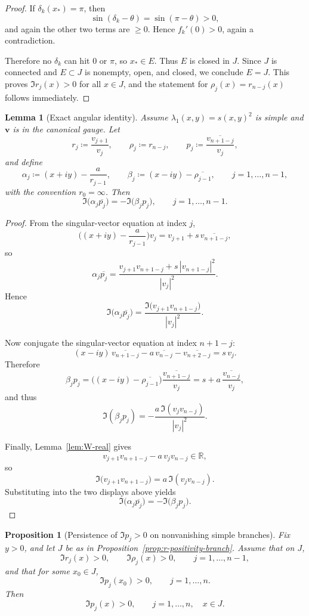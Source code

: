 \documentclass[11pt]{article}
\newtheorem{lemma}[theorem]{Lemma}
\newtheorem{proposition}[theorem]{Proposition}
\begin{document}
\begin{proof}
If \(\delta_k(x_*)=\pi\), then
\[
\sin(\delta_k-\theta)=\sin(\pi-\theta)>0,
\]
and again the other two terms are \(\ge 0\). Hence \(f_k'(0)>0\), again a contradiction.

Therefore no \(\delta_k\) can hit \(0\) or \(\pi\), so \(x_*\in E\). Thus \(E\) is closed in \(J\). Since \(J\) is connected and \(E\subset J\) is nonempty, open, and closed, we conclude \(E=J\). This proves \(\Im r_j(x)>0\) for all \(x\in J\), and the statement for \(\rho_j(x)=r_{n-j}(x)\) follows immediately.
\end{proof}

\begin{lemma}[Exact angular identity]\label{lem:angular-identity}
Assume \(\lambda_1(x,y)=s(x,y)^2\) is simple and \(\mathbf v\) is in the canonical gauge. Let
\[
r_j\coloneqq \frac{v_{j+1}}{v_j},
\qquad
\rho_j\coloneqq r_{n-j},
\qquad
p_j\coloneqq \frac{\overline{v_{n+1-j}}}{v_j},
\]
and define
\[
\alpha_j\coloneqq (x+iy)-\frac{a}{r_{j-1}},
\qquad
\beta_j\coloneqq (x-iy)-\overline{\rho_{j-1}},
\qquad
j=1,\dots,n-1,
\]
with the convention \(r_0=\infty\). Then
\[
\Im\!\bigl(\alpha_j\overline{p_j}\bigr)
=
-\Im\!\bigl(\beta_j p_j\bigr),
\qquad
j=1,\dots,n-1.
\]
\end{lemma}

\begin{proof}
From the singular-vector equation at index \(j\),
\[
\biggl((x+iy)-\frac{a}{r_{j-1}}\biggr)v_j
=
v_{j+1}+s\,\overline{v_{n+1-j}},
\]
so
\[
\alpha_j\overline{p_j}
=
\frac{v_{j+1}v_{n+1-j}+s\,|v_{n+1-j}|^2}{|v_j|^2}.
\]
Hence
\[
\Im\!\bigl(\alpha_j\overline{p_j}\bigr)
=
\frac{\Im\!\bigl(v_{j+1}v_{n+1-j}\bigr)}{|v_j|^2}.
\]

Now conjugate the singular-vector equation at index \(n+1-j\):
\[
(x-iy)\,\overline{v_{n+1-j}}-a\,\overline{v_{n-j}}-\overline{v_{n+2-j}}
=
s\,v_j.
\]
Therefore
\[
\beta_j p_j
=
\bigl((x-iy)-\overline{\rho_{j-1}}\bigr)\frac{\overline{v_{n+1-j}}}{v_j}
=
s+a\,\frac{\overline{v_{n-j}}}{v_j},
\]
and thus
\[
\Im(\beta_j p_j)
=
-\frac{a\,\Im(v_jv_{n-j})}{|v_j|^2}.
\]

Finally, Lemma~\ref{lem:W-real} gives
\[
v_{j+1}v_{n+1-j}-a\,v_jv_{n-j}\in\mathbb R,
\]
so
\[
\Im\!\bigl(v_{j+1}v_{n+1-j}\bigr)
=
a\,\Im(v_jv_{n-j}).
\]
Substituting into the two displays above yields
\[
\Im\!\bigl(\alpha_j\overline{p_j}\bigr)
=
-\Im\!\bigl(\beta_j p_j\bigr).
\]
\end{proof}

\begin{proposition}[Persistence of \(\Im p_j>0\) on nonvanishing simple branches]\label{prop:p-positivity-branch}
Fix \(y>0\), and let \(J\) be as in Proposition~\ref{prop:r-positivity-branch}. Assume that on \(J\),
\[
\Im r_j(x)>0,
\qquad
\Im \rho_j(x)>0,
\qquad
j=1,\dots,n-1,
\]
and that for some \(x_0\in J\),
\[
\Im p_j(x_0)>0,
\qquad
j=1,\dots,n.
\]
Then
\[
\Im p_j(x)>0,
\qquad
j=1,\dots,n,
\quad x\in J.
\]
\end{proposition}
\end{document}
